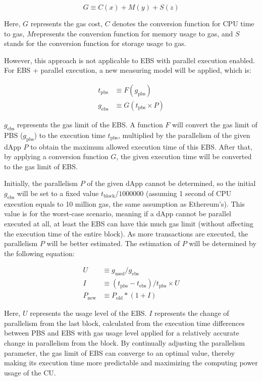 \begin{equation}
G \equiv C(x) + M(y) +  S(z)
\end{equation}

Here, $G$ represents the gas cost, $C$ denotes the conversion function for CPU time to gas, $M$represents the conversion function for memory usage to gas, and $S$ stands for the conversion function for storage usage to gas.

However, this approach is not applicable to EBS with parallel execution enabled. For EBS + parallel execution, a new measuring model will be applied, which is:

\begin{align}
t_\text{pbs} &\equiv F(g_\text{pbs}) \\
g_\text{ebs} &\equiv G( t_\text{pbs}  \times P) 
\end{align}

$g_\text{ebs}$ represents the gas limit of the EBS. A function $F$ will convert the gas limit of PBS ($g_\text{pbs}$) to the execution time $t_\text{pbs}$, multiplied by the parallelism of the given dApp $P$ to obtain the maximum allowed execution time of this EBS. After that, by applying a conversion function $G$, the given execution time will be converted to the gas limit of EBS.

Initially, the parallelism $P$ of the given dApp cannot be determined, so the initial $g_\text{ebs}$ will be set to a fixed value $t_\text{block} / 1000000$ (assuming 1 second of CPU execution equals to 10 million gas, the same assumption as Ethereum’s). This value is for the worst-case scenario, meaning if a dApp cannot be parallel executed at all, at least the EBS can have this much gas limit (without affecting the execution time of the entire block). As more transactions are executed, the parallelism $P$ will be better estimated. The estimation of $P$ will be determined by the following equation:

\begin{align}
U &\equiv g_\text{used} / g_\text{ebs} \\
I &\equiv (t_\text{pbs} - t_\text{ebs}) / t_\text{pbs} \times U \\
P_\text{new} &\equiv P_\text{old} * (1 + I)
\end{align}

Here, $U$ represents the usage level of the EBS. $I$ represents the change of parallelism from the last block, calculated from the execution time differences between PBS and EBS with gas usage level applied for a relatively accurate change in parallelism from the block. By continually adjusting the parallelism parameter, the gas limit of EBS can converge to an optimal value, thereby making its execution time more predictable and maximizing the computing power usage of the CU.

